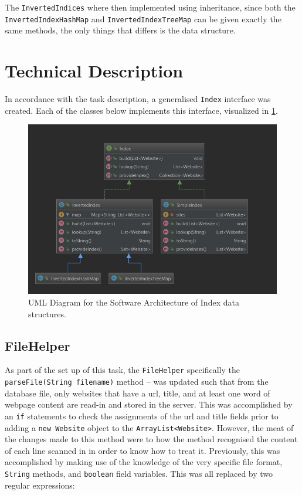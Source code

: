 The {\tt InvertedIndices} where then implemented using inheritance, since both the {\tt InvertedIndexHashMap} and {\tt InvertedIndexTreeMap} can be given exactly the same methods, the only things that differs is the data structure.

\newpage

\section{Technical Description}
In accordance with the task description, a generalised {\tt Index} interface was created. Each of the classes below implements this interface, visualized in \ref{fig:Index:uml}.

\begin{figure}[H]
    \centering
    \includegraphics[width=\textwidth]{figures/Diagram_InvertedIndices}
    \caption{UML Diagram for the Software Architecture of Index data structures.}
    \label{fig:Index:uml}
\end{figure}

\subsection{FileHelper}
As part of the set up of this task, the {\tt FileHelper} specifically the \\ {\tt parseFile(String filename)} method – was updated such that from the database file, only websites that have a url, title, and at least one word of webpage content are read-in and stored in the server.
This was accomplished by an {\tt if} statements to check the assignments of the url and title fields prior to adding a {\tt new Website} object to the {\tt ArrayList<Website>}. However, the meat of the changes made to this method were to how the method recognised the content of each line scanned in in order to know how to treat it.
Previously, this was accomplished by making use of the knowledge of the very specific file format, {\tt String} methods, and {\tt boolean} field variables.
This was all replaced by two regular expressions:

